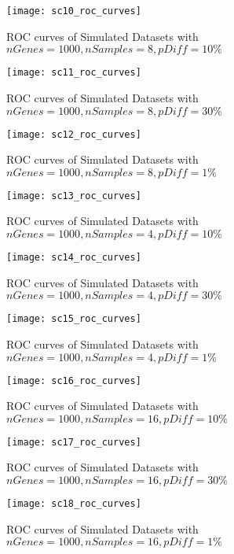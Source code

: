 \begin{figure}[h!tb] 
\texttt{[image: sc10\_roc\_curves]}
\caption{ROC curves of Simulated Datasets with $nGenes=1000, nSamples=8, pDiff=10\%$}
\label{sc10_roc}
\end{figure}




\begin{figure}[h!tb] 
\texttt{[image: sc11\_roc\_curves]}
\caption{ROC curves of Simulated Datasets with $nGenes=1000, nSamples=8, pDiff=30\%$}
\label{sc11_roc}
\end{figure}

\begin{figure}[h!tb] 
\texttt{[image: sc12\_roc\_curves]}
\caption{ROC curves of Simulated Datasets with $nGenes=1000, nSamples=8, pDiff=1\%$}
\label{sc12_roc}
\end{figure}


\begin{figure}[h!tb] 
\texttt{[image: sc13\_roc\_curves]}
\caption{ROC curves of Simulated Datasets with $nGenes=1000, nSamples=4, pDiff=10\%$}
\label{sc13_roc}
\end{figure}


\begin{figure}[h!tb] 
\texttt{[image: sc14\_roc\_curves]}
\caption{ROC curves of Simulated Datasets with $nGenes=1000, nSamples=4, pDiff=30\%$}
\label{sc14_roc}
\end{figure}


\begin{figure}[h!tb] 
\texttt{[image: sc15\_roc\_curves]}
\caption{ROC curves of Simulated Datasets with $nGenes=1000, nSamples=4, pDiff=1\%$}
\label{sc15_roc}
\end{figure}

\begin{figure}[h!tb] 
\texttt{[image: sc16\_roc\_curves]}
\caption{ROC curves of Simulated Datasets with $nGenes=1000, nSamples=16, pDiff=10\%$}
\label{sc16_roc}
\end{figure}

\begin{figure}[h!tb] 
\texttt{[image: sc17\_roc\_curves]}
\caption{ROC curves of Simulated Datasets with $nGenes=1000, nSamples=16, pDiff=30\%$}
\label{sc17_roc}
\end{figure}

\begin{figure}[h!tb] 
\texttt{[image: sc18\_roc\_curves]}
\caption{ROC curves of Simulated Datasets with $nGenes=1000, nSamples=16, pDiff=1\%$}
\label{sc18_roc}
\end{figure}